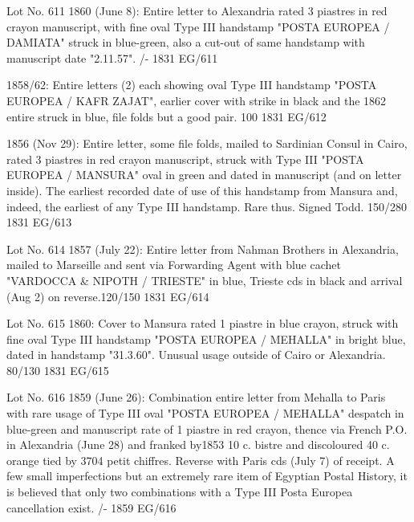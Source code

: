 \documentclass[justified]{tufte-book}
\begin{document}
%
{Lot No. 611
1860 (June 8): Entire letter to Alexandria rated 3 piastres in red crayon manuscript, with fine oval Type III handstamp "POSTA EUROPEA / DAMIATA" struck in blue-green, also a cut-out of same handstamp with manuscript date "2.11.57". /- 
 }%
{1831}%
{EG/611}%
{}%
{}
{}%
{}

%
{1858/62: Entire letters (2) each showing oval Type III handstamp "POSTA EUROPEA / KAFR ZAJAT", earlier cover with strike in black and the 1862 entire struck in blue, file folds but a good pair. 100 
 }%
{1831}%
{EG/612}%
{}%
{}
{}%
{}

%
{1856 (Nov 29): Entire letter, some file folds, mailed to Sardinian Consul in Cairo, rated 3 piastres in red crayon manuscript, struck with Type III "POSTA EUROPEA / MANSURA" oval in green and dated in manuscript (and on letter inside). The earliest recorded date of use of this handstamp from Mansura and, indeed, the earliest of any Type III handstamp. Rare thus. Signed Todd. 150/280  
}%
{1831}%
{EG/613}%
{}%
{}
{}%
{}

%
{Lot No. 614
1857 (July 22): Entire letter from Nahman Brothers in Alexandria, mailed to Marseille and sent via Forwarding Agent with blue cachet "VARDOCCA \& NIPOTH / TRIESTE" in blue, Trieste cds in black and arrival (Aug 2) on reverse.120/150  }%
{1831}%
{EG/614}%
{}%
{}
{}%
{}

%
{Lot No. 615
1860: Cover to Mansura rated 1 piastre in blue crayon, struck with fine oval Type III handstamp "POSTA EUROPEA / MEHALLA" in bright blue, dated in handstamp "31.3.60". Unusual usage outside of Cairo or Alexandria. 80/130  }%
{1831}%
{EG/615}%
{}%
{}
{}%
{}


%
{Lot No. 616
1859 (June 26): Combination entire letter from Mehalla to Paris with rare usage of Type III oval "POSTA EUROPEA / MEHALLA" despatch in blue-green and manuscript rate of 1 piastre in red crayon, thence via French P.O. in Alexandria (June 28) and franked by1853 10 c. bistre and discoloured 40 c. orange tied by 3704 petit chiffres. Reverse with Paris cds (July 7) of receipt. A few small imperfections but an extremely rare item of Egyptian Postal History, it is believed that only two combinations with a Type III Posta Europea cancellation exist. 
/-  
}%
{1859}%
{EG/616}%
{}%
{}
{}%
{}
\end{document}
